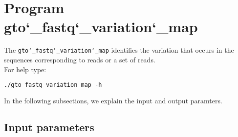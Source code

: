 \section{Program gto\char`_fastq\char`_variation\char`_map}

The \texttt{gto\char`_fastq\char`_variation\char`_map} identifies the variation that occurs in the sequences corresponding to reads or a set of reads.\\

For help type:
\begin{lstlisting}
./gto_fastq_variation_map -h
\end{lstlisting}
In the following subsections, we explain the input and output paramters.

\subsection*{Input parameters}

